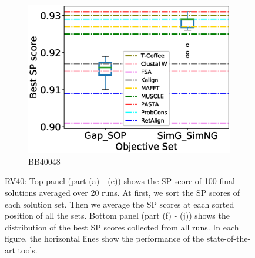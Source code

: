\begin{figure}[!htbp]
\begin{adjustwidth}{-1.5cm}{-1cm}
\begin{subfigure}{0.22\textwidth}
			\includegraphics[width=\columnwidth]{Figure/summary/precomputedInit/Balibase/BB40048_objset_pairs_rank_2}
			\caption{BB40048}
		\end{subfigure}
		\end{adjustwidth}
		\caption[SP score results on RV40]{\underline{RV40:} Top panel (part (a) - (e)) shows the SP score of 100 final solutions averaged over 20 runs. At first, we sort the SP scores of each solution set. Then we average the SP scores at each sorted position of all the sets. Bottom panel (part (f) - (j)) shows the distribution of the best SP scores collected from all runs. In each figure, the horizontal lines show the performance of the state-of-the-art tools.}
		\label{fig:rv40_sp}

\end{figure}


